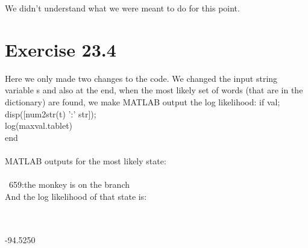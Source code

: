 \documentclass[11pt,a4paper,oneside]{report}
\begin{document}
We didn't understand what we were meant to do for this point.

\section*{Exercise 23.4}

Here we only made two changes to the code. We changed the input string variable s and also at the end, when the most likely set of words (that are in the dictionary) are found, we make MATLAB output the log likelihood:
    if val; \\
        disp([num2str(t) ':' str]);\\
        log(maxval.table{t}) \\
    end\\\\
    
    MATLAB outputs for the most likely state:\\\\\
    659:the monkey is on the branch\\

And the log likelihood of that state is:\\\\\

  -94.5250
\end{document}

